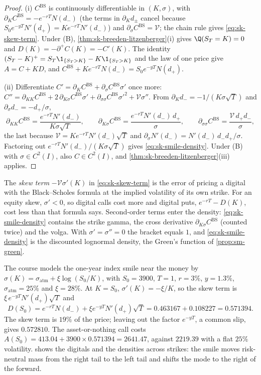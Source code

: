 \begin{proof}
(i) $C^{\mathrm{BS}}$ is continuously differentiable in $(K,\sigma)$, with $\partial_KC^{\mathrm{BS}}=-e^{-rT}N(d_-)$ (the
terms in $\partial_Kd_\pm$ cancel because $S_0e^{-yT}N'(d_+)=Ke^{-rT}N'(d_-)$) and $\partial_\sigma C^{\mathrm{BS}}=\mathcal V$;
the chain rule gives \eqref{eq:sk-skew-term}. Under (B), \cref{thm:sk-breeden-litzenberger}(i) gives
$\Q(S_T=K)=0$ and $D(K)=-\partial^+C(K)=-C'(K)$. The identity
$(S_T-K)^+=S_T\1_{\{S_T>K\}}-K\1_{\{S_T>K\}}$ and the law of one price give $A=C+KD$, and
$C^{\mathrm{BS}}+Ke^{-rT}N(d_-)=S_0e^{-yT}N(d_+)$.

(ii) Differentiate $C'=\partial_KC^{\mathrm{BS}}+\partial_\sigma C^{\mathrm{BS}}\sigma'$ once more:
$C''=\partial_{KK}C^{\mathrm{BS}}+2\,\partial_{K\sigma}C^{\mathrm{BS}}\sigma'+\partial_{\sigma\sigma}C^{\mathrm{BS}}\sigma'^2+\mathcal V\sigma''$.
From $\partial_Kd_-=-1/(K\sigma\sqrt T)$ and $\partial_\sigma d_-=-d_+/\sigma$,
\[
  \partial_{KK}C^{\mathrm{BS}}=\frac{e^{-rT}N'(d_-)}{K\sigma\sqrt T},\qquad
  \partial_{K\sigma}C^{\mathrm{BS}}=\frac{e^{-rT}N'(d_-)\,d_+}{\sigma},\qquad
  \partial_{\sigma\sigma}C^{\mathrm{BS}}=\frac{\mathcal V\,d_+d_-}{\sigma},
\]
the last because $\mathcal V=Ke^{-rT}N'(d_-)\sqrt T$ and $\partial_\sigma N'(d_-)=N'(d_-)\,d_-d_+/\sigma$.
Factoring out $e^{-rT}N'(d_-)/(K\sigma\sqrt T)$ gives \eqref{eq:sk-smile-density}. Under (B) with
$\sigma\in C^2(I)$, also $C\in C^2(I)$, and \cref{thm:sk-breeden-litzenberger}(iii) applies.
\end{proof}

The \emph{skew term} $-\mathcal V\sigma'(K)$ in \eqref{eq:sk-skew-term} is the error of pricing a digital with
the Black--Scholes formula at the implied volatility of its own strike. For an equity skew,
$\sigma'<0$, so digital calls cost more and digital puts, $e^{-rT}-D(K)$, cost less than that formula
says. Second-order terms enter the density: \eqref{eq:sk-smile-density} contains the strike gamma,
the cross derivative $\partial_{K\sigma}C^{\mathrm{BS}}$ (counted twice) and the volga. With $\sigma'=\sigma''=0$
the bracket equals $1$, and \eqref{eq:sk-smile-density} is the discounted lognormal density, the Green's
function of \cref{prop:sm-green}.

\begin{example}\label{exa:sk-course-digital}
The course models the one-year index smile near the money by
$\sigma(K)=\sigma_{\mathrm{atm}}+\xi\log(S_0/K)$, with $S_0=3900$, $T=1$, $r=3\%$, $y=1.3\%$,
$\sigma_{\mathrm{atm}}=25\%$ and $\xi=28\%$. At $K=S_0$, $\sigma'(K)=-\xi/K$, so the skew term is
$\xi\,e^{-yT}N'(d_+)\sqrt T$ and
\[
  D(S_0)=e^{-rT}N(d_-)+\xi e^{-yT}N'(d_+)\sqrt T=0.463167+0.108227=0.571394 .
\]
The skew term is $19\%$ of the price; leaving out the factor $e^{-yT}$, a common slip, gives $0.572810$.
The asset-or-nothing call costs $A(S_0)=413.04+3900\times0.571394=2641.47$, against $2219.39$ with a flat
$25\%$ volatility.  shows the digitals and the densities across strikes: the smile
moves risk-neutral mass from the right tail to the left tail and shifts the mode to the right of the
forward.
\end{example}


